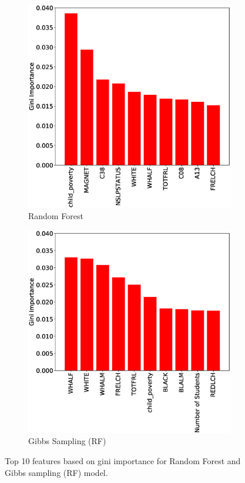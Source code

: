 \begin{figure}
	\begin{subfigure}{.2325\textwidth}
		\includegraphics[width=\linewidth]{images/features_rf}
		\caption{Random Forest}
	\end{subfigure}
	\hspace{\fill}
	\begin{subfigure}{.2325\textwidth}
		\includegraphics[width=\linewidth]{images/features_gs}
		\caption{Gibbs Sampling (RF)}
	\end{subfigure}
	\caption{Top 10 features based on gini importance for Random Forest and Gibbs sampling (RF) model.}
	\label{fig:features}
\end{figure}


